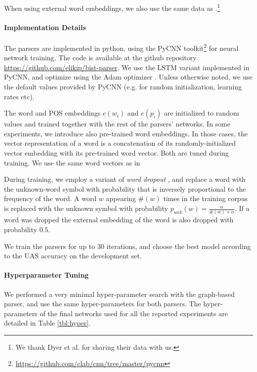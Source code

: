 \documentclass[11pt]{article}
\begin{document}
When using external word embeddings, we also use the same data as
.\footnote{We thank Dyer et al. for
sharing their data with us.}


\paragraph{Implementation Details}
The parsers are implemented in python, using the PyCNN
toolkit\footnote{\url{https://github.com/clab/cnn/tree/master/pycnn}} for neural network
training. The code is available at the github repository \url{https://github.com/elikip/bist-parser}.
We use the LSTM variant implemented in PyCNN, and optimize using the Adam
optimizer \cite{kingma2014adam}.  Unless otherwise noted, we use the default values provided
by PyCNN (e.g. for random initialization, learning rates etc). 


The word and POS embeddings $e(w_i)$ and $e(p_i)$ are initialized to random
values and trained together with the rest of the parsers' networks. 
In some experiments, we introduce also pre-trained word embeddings. In those
cases,
the vector representation of a word is a concatenation
of its randomly-initialized vector embedding with its pre-trained word vector.
Both are tuned during training.
We use the same word vectors as in 

During training, we employ a variant of \emph{word dropout}
\cite{iyyer2015deep}, and replace a word with the unknown-word symbol with probability
that is inversely proportional to the frequency of the word. A 
word $w$ appearing $\#(w)$ times in the training corpus is replaced with the unknown symbol
with probability  $p_{unk}(w) = \frac{\alpha}{\#(w)+\alpha}$.
If a word was dropped the external embedding of the word is also dropped with probability $0.5$.

We train the parsers for up to 30 iterations, and choose the best model
according to the UAS accuracy on the development set.

\paragraph{Hyperparameter Tuning}
We performed a very minimal hyper-parameter search with the graph-based parser,
and use the same hyper-parameters for both parsers.
The hyper-parameters of the final networks used for all the reported experiments
are detailed in Table \ref{tbl:hyper}.
\end{document}
